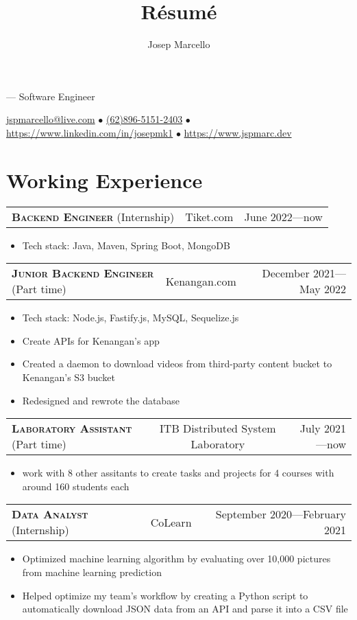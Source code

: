 \documentclass[10pt]{article}
\makeatletter
\renewcommand{\maketitle}{
    \rmfamily
    \noindent
    {\Huge \theauthor} ---
    \sffamily
    Software Engineer

    \vspace{0.1em}
    \noindent
    \href{mailto:jspmarcello@live.com}{jspmarcello@live.com} $\bullet$
    \href{https://wa.me/6289651512403}{(62)896-5151-2403} $\bullet$
    \href{https://www.linkedin.com/in/josepmk1}{https://www.linkedin.com/in/josepmk1} $\bullet$
    \href{https://www.jspmarc.dev}{https://www.jspmarc.dev}
}
\newcommand{\workExpVspace}{0.5em}
\newcommand{\workExp}[6]{
    \noindent \begin{tabularx}{\textwidth}{@{}X c|r}
        \textbf{\textsc{#5}} (#2) & #1 & #3---#4
    \end{tabularx}

    {#6}
    \vspace{\workExpVspace}
}
\makeatother
\begin{document}
\title{R\'esum\'e}
\author{Josep Marcello}

\maketitle

\section{Working Experience}

\workExp
    {Tiket.com}
    {Internship}
    {June 2022}
    {now}
    {Backend Engineer}
    {
        \begin{itemize}
            \item Tech stack: Java, Maven, Spring Boot, MongoDB
        \end{itemize}
    }

\workExp
    {Kenangan.com}
    {Part time}
    {December 2021}
    {May 2022}
    {Junior Backend Engineer}
    {
        \begin{itemize}
            \item Tech stack: Node.js, Fastify.js, MySQL, Sequelize.js
            \item Create APIs for Kenangan's app
            \item Created a daemon to download videos from third-party content bucket to Kenangan's
                S3 bucket
            \item Redesigned and rewrote the database
        \end{itemize}
    }

\workExp
    {ITB Distributed System Laboratory}
    {Part time}
    {July 2021}
    {now}
    {Laboratory Assistant}
    {
        \begin{itemize}
            \item work with 8 other assitants to create tasks and projects for 4 courses with
                around 160 students each
        \end{itemize}
    }

\workExp
    {CoLearn}
    {Internship}
    {September 2020}
    {February 2021}
    {Data Analyst}
    {
        \begin{itemize}
            \item Optimized machine learning algorithm by evaluating over 10,000 pictures from
                machine learning prediction
            \item Helped optimize my team's workflow by creating a Python script to automatically
                download JSON data from an API and parse it into a CSV file
        \end{itemize}
    }
\end{document}
